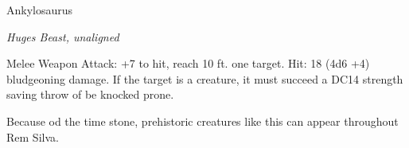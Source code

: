 \documentclass[letterpaper,10pt,twoside,twocolumn,openany]{book}
\begin{document}
\begin{monsterbox}{Ankylosaurus}
	\begin{hangingpar}
		\textit{Huges Beast, unaligned}
	\end{hangingpar}
	\dndline%
	\basics[%
	armorclass = 15,
	hitpoints  = 68,
	speed      = 30 ft
	]
	\dndline%
	\stats[
	STR = \stat{19}, %
	DEX = \stat{11},
	CON = \stat{15},
	INT = \stat{2},
	WIS = \stat{12},
	CHA = \stat{5}
	]
	\dndline%
	\details[%
	senses = {passive perception 11},
	challenge = 3 (700XP)
	]
	\dndline%
	\begin{monsteraction}[Tail]
		Melee Weapon Attack: +7 to hit, reach 10 ft. one target. Hit: 18 (4d6 +4) bludgeoning damage. If the target is a creature, it must succeed a DC14 strength saving throw of be knocked prone.
	\end{monsteraction}
		Because od the time stone, prehistoric creatures like this can appear throughout Rem Silva.
\end{monsterbox}
\end{document}
